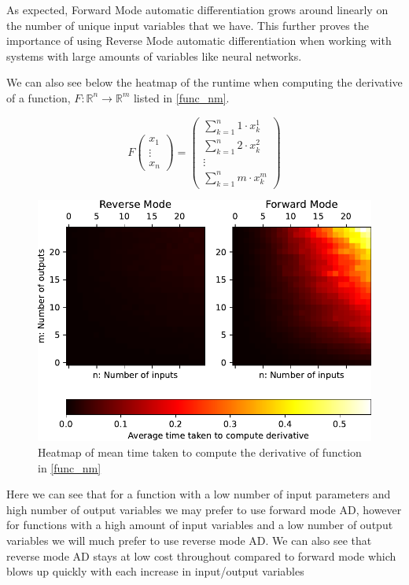 \documentclass{article}
\begin{document}
As expected, Forward Mode automatic differentiation grows around linearly on the number of unique input variables that we have. This further proves the importance of using Reverse Mode automatic differentiation when working with systems with large amounts of variables like neural networks.

We can also see below the heatmap of the runtime when computing the derivative of a function, $F: \mathbb{R}^n \rightarrow \mathbb{R}^m$ listed in \eqref{func_nm}.

\begin{equation}
    F \begin{pmatrix}
        x_1 \\ \vdots \\ x_n
    \end{pmatrix} = \begin{pmatrix}
        \sum_{k=1}^n 1 \cdot x_k^1 \\ \sum_{k=1}^n 2 \cdot x_{k}^{2} \\ \vdots \\ \sum_{k=1}^n m \cdot x_{k}^{m}
    \end{pmatrix}
    \label{func_nm}
\end{equation}


\begin{figure}[h]
    \centering
    \includegraphics{images/Graph_HeatmapTimeDiff.pdf}
    \caption{Heatmap of mean time taken to compute the derivative of function in \eqref{func_nm}}
    \label{fig:heatmap}
\end{figure}

Here we can see that for a function with a low number of input parameters and high number of output variables we may prefer to use forward mode AD, however for functions with a high amount of input variables and a low number of output variables we will much prefer to use reverse mode AD. We can also see that reverse mode AD stays at low cost throughout compared to forward mode which blows up quickly with each increase in input/output variables
\end{document}
